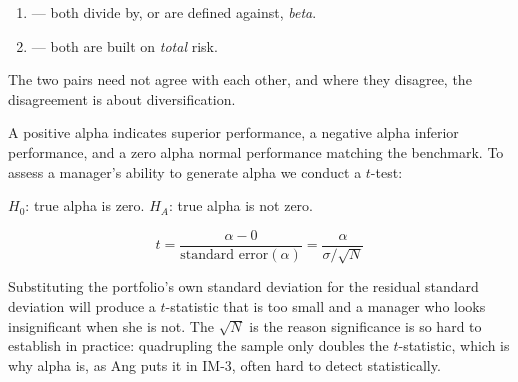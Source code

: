 \begin{imkeybox}[title={Ranking portfolios using these ratios}]
\begin{enumerate}
\item {} ---
both divide by, or are defined against, \emph{beta}.
\item {} --- both are built on
\emph{total} risk.
\end{enumerate}
The two pairs need not agree with each other, and where they disagree, the
disagreement is about diversification.
\end{imkeybox}


A positive alpha indicates superior performance, a negative alpha inferior
performance, and a zero alpha normal performance matching the benchmark. To
assess a manager's ability to generate alpha we conduct a $t$-test:

\begin{imkeybox}
$H_0$: true alpha is zero. \qquad $H_A$: true alpha is not zero.
\end{imkeybox}

\begin{imfmlbox}
\[ t = \frac{\alpha - 0}{\text{standard error}(\alpha)} = \frac{\alpha}{\sigma/\sqrt{N}} \]
\end{imfmlbox}

\begin{imtrapbox}[breakable=false,title={Which sigma, and why $\sqrt{N}$}]
Substituting the portfolio's own standard deviation for the residual standard
deviation will produce a $t$-statistic that is too small and a manager who looks
insignificant when she is not. The $\sqrt{N}$ is the reason significance is so
hard to establish in practice: quadrupling the sample only doubles the
$t$-statistic, which is why alpha is, as Ang puts it in IM-3, often hard to detect
statistically.
\end{imtrapbox}



